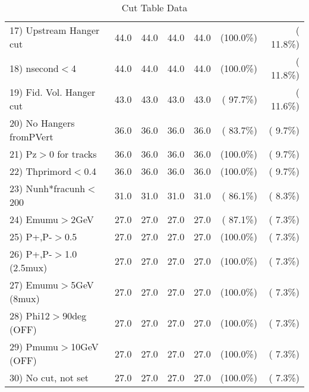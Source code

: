 \begin{table}[h!]
\begin{tabular}{||l||r|r|r|r|r|r||}
 17) Upstream Hanger cut  &         44.0 &         44.0 &         44.0 &         44.0 & (100.0\%) & ( 11.8\%) \\
 18) nsecond$<$4          &         44.0 &         44.0 &         44.0 &         44.0 & (100.0\%) & ( 11.8\%) \\
 19) Fid. Vol. Hanger cut &         43.0 &         43.0 &         43.0 &         43.0 & ( 97.7\%) & ( 11.6\%) \\
 20) No Hangers fromPVert &         36.0 &         36.0 &         36.0 &         36.0 & ( 83.7\%) & (  9.7\%) \\
 21) Pz$>$0 for tracks    &         36.0 &         36.0 &         36.0 &         36.0 & (100.0\%) & (  9.7\%) \\
 22) Thprimord$<$0.4      &         36.0 &         36.0 &         36.0 &         36.0 & (100.0\%) & (  9.7\%) \\
 23) Nunh*fracunh$<$200   &         31.0 &         31.0 &         31.0 &         31.0 & ( 86.1\%) & (  8.3\%) \\
 24) Emumu$>$2GeV         &         27.0 &         27.0 &         27.0 &         27.0 & ( 87.1\%) & (  7.3\%) \\
 25) P+,P-$>$0.5          &         27.0 &         27.0 &         27.0 &         27.0 & (100.0\%) & (  7.3\%) \\
 26) P+,P-$>$1.0 (2.5mux) &         27.0 &         27.0 &         27.0 &         27.0 & (100.0\%) & (  7.3\%) \\
 27) Emumu$>$5GeV  (8mux) &         27.0 &         27.0 &         27.0 &         27.0 & (100.0\%) & (  7.3\%) \\
 28) Phi12$>$90deg  (OFF) &         27.0 &         27.0 &         27.0 &         27.0 & (100.0\%) & (  7.3\%) \\
 29) Pmumu$>$10GeV  (OFF) &         27.0 &         27.0 &         27.0 &         27.0 & (100.0\%) & (  7.3\%) \\
 30) No cut, not set      &         27.0 &         27.0 &         27.0 &         27.0 & (100.0\%) & (  7.3\%) \\
 \hline
 \hline
 \end{tabular}
 \caption{Cut Table  Data     }
 \label{tab-cutcohjpsi-mumu_data}
 \end{table}
